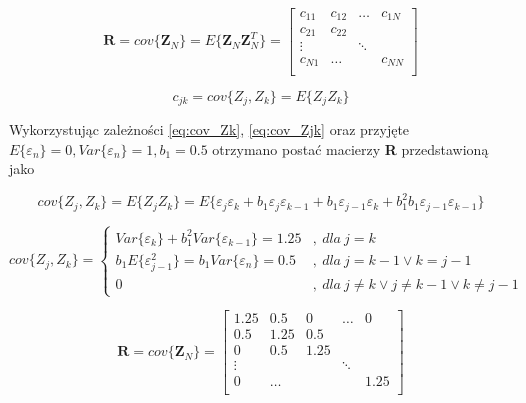 \documentclass[12pt,a4paper]{article}
\begin{document}
\begin{equation}\label{eq:mac_kow_skor}
\boldsymbol{R} = cov\{\boldsymbol{Z}_{N}\}=E\{\boldsymbol{Z}_{N}\boldsymbol{Z}_{N}^T\}=\begin{bmatrix}
c_{11} & c_{12} & \dots & c_{1N}\\
c_{21} & c_{22} &       & \\
\vdots & & \ddots & \\
c_{N1} & \dots & & c_{NN}\\
\end{bmatrix}
\end{equation}

\begin{equation}\label{eq:cov_cjk}
c_{jk} = cov\{Z_{j},Z_{k}\} = E\{Z_{j}Z_{k}\}
\end{equation}

Wykorzystując zależności \ref{eq:cov_Zk}, \ref{eq:cov_Zjk} oraz przyjęte $E\{\varepsilon_{n}\}=0,Var\{\varepsilon_{n}\}=1,b_{1}=0.5$ otrzymano postać macierzy \textbf{R} przedstawioną jako 

\begin{equation}\label{eq:cov_Zjk}
cov\{Z_{j},Z_{k}\} = E\{Z_{j}Z_{k}\} = E\{\varepsilon_{j}\varepsilon_{k} + b_{1}\varepsilon_{j}\varepsilon_{k-1} + b_{1}\varepsilon_{j-1}\varepsilon_{k} + b_{1}^2b_{1}\varepsilon_{j-1}\varepsilon_{k-1}\}
\end{equation}

\begin{equation}\label{eq:cov_Zk}
cov\{Z_{j},Z_{k}\} = \begin{cases} Var\{\varepsilon_{k}\} + b_{1}^{2}Var\{\varepsilon_{k-1}\} = 1.25 &,\ dla\ j=k \\ b_{1}E\{\varepsilon_{j-1}^{2}\} = b_{1}Var\{\varepsilon_{n}\} = 0.5 &,\ dla\ j = k-1 \lor k=j-1\\0 &,\ dla\ j \neq k \lor j \neq k-1 \lor k \neq j-1
\end{cases}
\end{equation}


\begin{equation}\label{eq:mac_kow_ZN}
\boldsymbol{R} = cov\{\boldsymbol{Z}_{N}\}=\begin{bmatrix}
1.25 & 0.5 & 0&\dots & 0\\
0.5 & 1.25 & 0.5 &      & \\
0 & 0.5 & 1.25  &    & \\
\vdots & & & \ddots & \\
0 & \dots && & 1.25\\
\end{bmatrix}
\end{equation}
\end{document}

